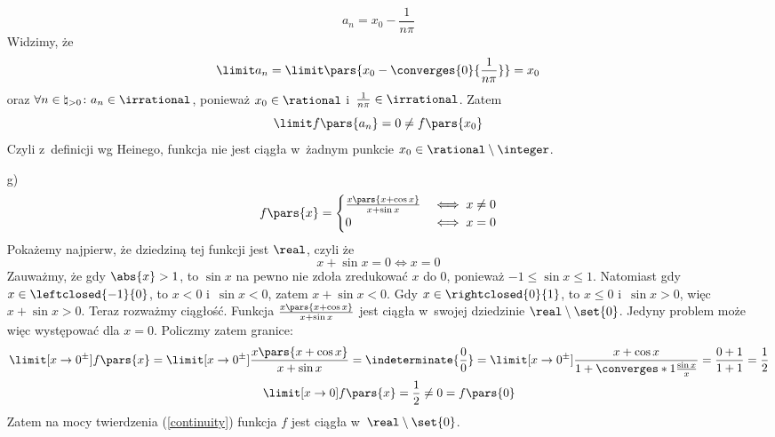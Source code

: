\begin{itemize}
        \begin{equation*}
            a_n = x_0 - \frac{1}{n\pi}
        \end{equation*}
        Widzimy, że
        \begin{equation*}
            \limit a_n = \limit \pars{x_0 - \converges{0}{\frac{1}{n\pi}}} = x_0
        \end{equation*}
        oraz \(\forall n \in \natural_{> 0}\colon a_n \in \irrational\), ponieważ \(x_0 \in \rational\) i~\(\frac{1}{n\pi} \in \irrational\). Zatem
        \begin{equation*}
            \limit f\pars{a_n} = 0 \neq f\pars{x_0}
        \end{equation*}
        Czyli z~definicji wg Heinego, funkcja nie jest ciągła w~żadnym punkcie \(x_0 \in \rational \setminus \integer\).
    \item[g)]
        \begin{gather*}
            f\pars{x} = \begin{cases}
                \frac{x\pars{x + \cos x}}{x + \sin x} & \iff x \neq 0\\
                0 & \iff x = 0
            \end{cases}
        \end{gather*}
        Pokażemy najpierw, że dziedziną tej funkcji jest \(\real\), czyli że
        \begin{equation*}
            x + \sin x = 0 \iff x = 0
        \end{equation*}
        Zauważmy, że gdy \(\abs{x} > 1\), to \(\sin x\) na pewno nie zdoła zredukować \(x\) do \(0\), ponieważ \(-1 \leq \sin x \leq 1\). Natomiast gdy \(x \in \leftclosed{-1}{0}\), to \(x < 0\) i~\(\sin x < 0\), zatem \(x + \sin x < 0\). Gdy \(x \in \rightclosed{0}{1}\), to \(x \leq 0\) i~\(\sin x > 0\), więc \(x + \sin x > 0\). Teraz rozważmy ciągłość. Funkcja \(\frac{x\pars{x + \cos x}}{x + \sin x}\) jest ciągła w~swojej dziedzinie \(\real \setminus \set{0}\). Jedyny problem może więc występować dla \(x = 0\). Policzmy zatem granice:
        \begin{gather*}
            \limit[x \to 0^\pm] f\pars{x}
                = \limit[x \to 0^\pm] \frac{x\pars{x + \cos x}}{x + \sin x}
                = \indeterminate{\frac{0}{0}}
                = \limit[x \to 0^\pm] \frac{x + \cos x}{1 + \converges*{1}{\frac{\sin x}{x}}}
                = \frac{0 + 1}{1 + 1}
                = \frac{1}{2}\\
            \limit[x \to 0] f\pars{x}
                = \frac{1}{2} \neq 0 = f\pars{0}
        \end{gather*}
        Zatem na mocy twierdzenia (\ref{continuity}) funkcja \(f\) jest ciągła w~\(\real \setminus \set{0}\).
\end{itemize}
